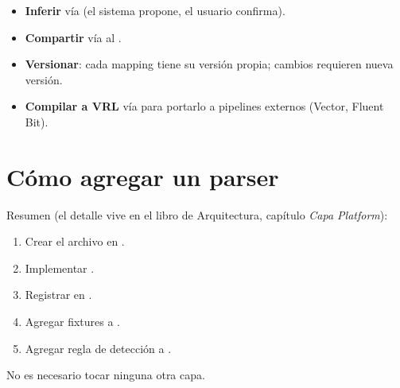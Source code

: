 \begin{itemize}
    \item \textbf{Inferir} vía  (el sistema
    propone, el usuario confirma).
    \item \textbf{Compartir} vía  al
    .
    \item \textbf{Versionar}: cada mapping tiene su versión
    propia; cambios requieren nueva versión.
    \item \textbf{Compilar a VRL} vía  para
    portarlo a pipelines externos (Vector, Fluent Bit).
\end{itemize}

\section{Cómo agregar un parser}

Resumen (el detalle vive en el libro de Arquitectura, capítulo
\emph{Capa Platform}):

\begin{enumerate}
    \item Crear el archivo en .
    \item Implementar .
    \item Registrar en .
    \item Agregar fixtures a .
    \item Agregar regla de detección a .
\end{enumerate}

No es necesario tocar ninguna otra capa.
